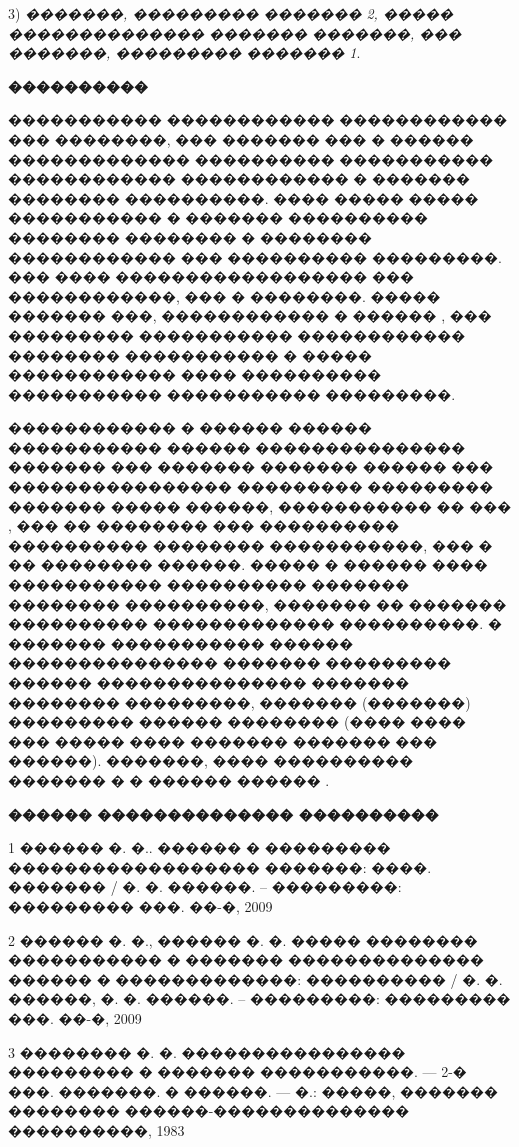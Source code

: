 \documentclass[a4paper]{article}
\begin{document}
  3) {\it�������, ��������� ������� 2, ����� �������������� ������� �������, ��� �������, ��������� ������� 1}.

  \newpage
  \begin{center}
 {\bf ���������� } 
  \end{center}

  ����������� ������������ ������������ ��� ��������, ���  ������� ��� � ������ ������������� ���������� ����������� ������������ ������������ � ������� �������� ����������.  ���� ����� ����� ����������� � ������� ���������� �������� �������� � �������� ������������ ��� ���������� ���������.   ��� ���� ������������������ ��� ������������, ��� � ��������. ����� ������� ���, ������������ � ������ \cite{lezh2}, ��� ��������� ����������� ������������ �������� ����������� � ����� ������������  ���� ���������� ����������� ����������� ���������.										

  ������������ � ������ ������ ����������� ������ ��������������� ������� ��� ������� ������� ������ ��� ���������������� ��������� ��������� ������� ����� ������, ����������� �� ��� \cite{lezh2},  ��� �� �������� ��� ���������� ���������� �������� �����������, ��� � �� �������� ������. ����� � ������ ���� ����������� ���������� ������� �������� ����������, ������� �� ������� ���������� ������������� ����������.  � ������� ����������� ������ ��������������� ������� ��������� ������ ��������������� ������� �������� ���������, ������� (�������) ��������� ������ �������� (���� ���� ��� ����� ���� ������� ������� ��� ������). �������, ���� ���������� ������� � � ������ ������ \cite{lezh2}.

\newpage

\begin{center}
  {\bf ������ �������������� ����������}
\end{center}

1 ������ �. �.. ������ � ��������� ������������������ �������: ����. ������� / �. �. ������. -- ���������: ��������� ���. ��-�, 2009

2 ������ �. �.,  ������ �. �. ����� �������� ����������� � ������� �������������� ������ � �������������: ���������� / �. �. ������, �. �. ������. -- ���������: ��������� ���. ��-�, 2009

3 �������� �. �. ���������������� ��������� � ������� �����������. --- 2-� ���. �������. � ������. --- �.: �����, ������� �������� ������-�������������� ����������, 1983
\end{document}
